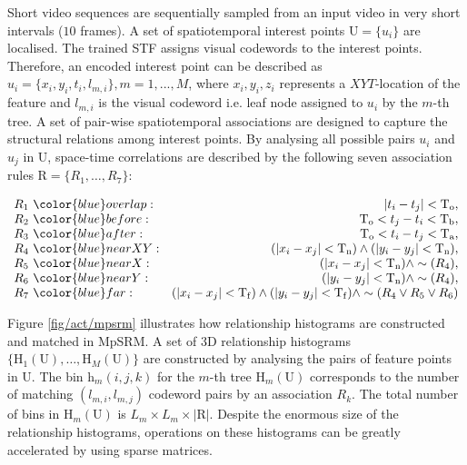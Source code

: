 Short video sequences are sequentially sampled from an input video in very short intervals (\eg$10$ frames). A set of spatiotemporal interest points $\mathrm{U} = \{u_{i}\}$ are localised. The trained STF assigns visual codewords to the interest points. Therefore, an encoded interest point can be described as $u_{i} = \{x_i, y_i, t_i, l_{m,i}\}, m=1,...,M$, where $x_i, y_i, z_i$ represents a $XYT$-location of the feature and $l_{m,i}$ is the visual codeword i.e. leaf node assigned to $u_{i}$ by the $m$-th tree. A set of pair-wise spatiotemporal associations are designed to capture the structural relations among interest points. By analysing all possible pairs $u_i$ and $u_j$ in $\mathrm{U}$, space-time correlations are described by the following seven association rules $\mathrm{R} = \{ R_1,\dots,R_7\}$:

\begin{equation}
\centering 
\begin{array}{lr}
R_{1}~{\color{blue}overlap}: & |t_i - t_j| < \mathrm{T_{o}}, \\
R_{2}~{\color{blue}before}: & \mathrm{T_{o}} < t_j - t_i < \mathrm{T_{b}}, \\
R_{3}~{\color{blue}after}: & \mathrm{T_{o}} < t_i - t_j < \mathrm{T_{a}}, \\
R_{4}~{\color{blue}nearXY}: & (|x_i - x_j| < \mathrm{T_{n}}) \wedge (|y_i - y_j| < \mathrm{T_{n}}), \\
R_{5}~{\color{blue}nearX}: & (|x_i - x_j| < \mathrm{T_{n}}) \wedge \sim(R_{4}), \\
R_{6}~{\color{blue}nearY}: & (|y_i - y_j| < \mathrm{T_{n}}) \wedge \sim(R_{4}), \\
R_{7} ~{\color{blue}far}: & (|x_i - x_j| < \mathrm{T_{f}}) \wedge (|y_i - y_j| < \mathrm{T_{f}}) \wedge \sim(R_{4} \vee R_{5} \vee R_{6})
\end{array}
\end{equation}

Figure \ref{fig/act/mpsrm} illustrates how relationship histograms are constructed and matched in MpSRM. A set of 3D relationship histograms $\{ \mathrm{H}_1(\mathrm{U}),\dots,\mathrm{H}_{M}(\mathrm{U})\}$ are constructed by analysing the pairs of feature points in $\mathrm{U}$. The bin $\mathrm{h}_{m}(i,j,k)$ for the $m$-th tree $\mathrm{H}_{m}(\mathrm{U})$ corresponds to the number of matching $(l_{m,i},l_{m,j})$ codeword pairs by an association $R_k$. The total number of bins in $\mathrm{H}_m(\mathrm{U})$ is $L_m \times L_m \times |\mathrm{R}|$. Despite the enormous size of the relationship histograms, operations on these histograms can be greatly accelerated by using sparse matrices.

